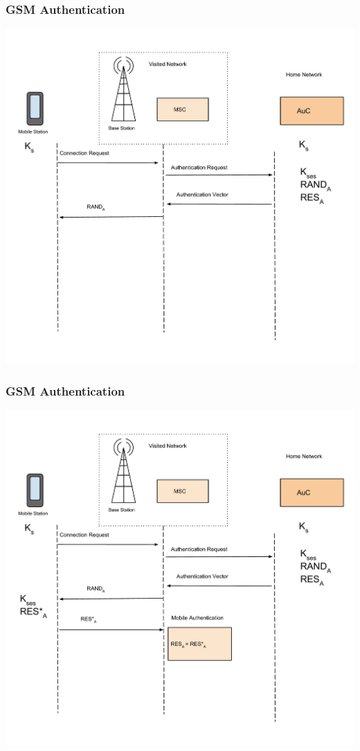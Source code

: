 \documentclass{beamer}
\begin{document}
\begin{frame}
  \frametitle{GSM Authentication}
  \begin{center}
  \includegraphics[scale =.25]{Images/GSMAuthentication2.pdf}

  \end{center} 
\end{frame}
\begin{frame}
  \frametitle{GSM Authentication}
  \begin{center}
  \includegraphics[scale =.25]{Images/GSMAuthentication3.pdf}

  \end{center} 
\end{frame}
\end{document}
